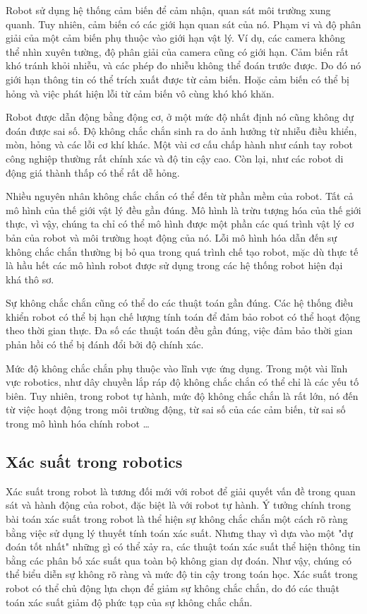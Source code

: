 Robot sử dụng hệ thống cảm biến để cảm nhận, quan sát môi trường xung quanh. Tuy nhiên, cảm biến có các giới hạn quan sát của nó. Phạm vi và độ phân giải của một cảm biến phụ thuộc vào giới hạn vật lý. Ví dụ, các camera không thể nhìn xuyên tường, độ phân giải của camera cũng có giới hạn. Cảm biến rất khó tránh khỏi nhiễu, và các phép đo nhiễu không thể đoán trước được. Do đó nó giới hạn thông tin có thể trích xuất được từ cảm biến. Hoặc cảm biến có thể bị hỏng và việc phát hiện lỗi từ cảm biến vô cùng khó khó khăn. 

Robot được dẫn động bằng động cơ, ở một mức độ nhất định nó cũng không dự đoán được sai số. Độ không chắc chắn sinh ra do ảnh hưởng từ nhiễu điều khiển, mòn, hỏng và các lỗi cơ khí khác. Một vài cơ cấu chấp hành như cánh tay robot công nghiệp thường rất chính xác và độ tin cậy cao. Còn lại, như các robot di động giá thành thấp có thể rất dễ hỏng. 

Nhiều nguyên nhân không chắc chắn có thể đến từ phần mềm của robot. Tất cả mô hình của thế giới vật lý đều gần đúng. Mô hình là trừu tượng hóa của thế giới thực, vì vậy, chúng ta chỉ có thể mô hình được một phần các quá trình vật lý cơ bản của robot và môi trường hoạt động của nó. Lỗi mô hình hóa dẫn đến sự không chắc chắn thường bị bỏ qua trong quá trình chế tạo robot, mặc dù thực tế là hầu hết các mô hình robot được sử dụng trong các hệ thống robot hiện đại khá thô sơ. 

Sự không chắc chắn cũng có thể do các thuật toán gần đúng. Các hệ thống điều khiển robot có thể bị hạn chế lượng tính toán để đảm bảo robot có thể hoạt động theo thời gian thực. Đa số các thuật toán đều gần đúng, việc đảm bảo thời gian phản hồi có thể bị đánh đổi bởi độ chính xác. 

Mức độ không chắc chắn phụ thuộc vào lĩnh vực ứng dụng. Trong một vài lĩnh vực robotics, như dây chuyền lắp ráp độ không chắc chắn có thể chỉ là các yếu tố biên. Tuy nhiên, trong robot tự hành, mức độ không chắc chắn là rất lớn, nó đến từ việc hoạt động trong môi trường động, từ sai số của các cảm biến, từ sai số trong mô hình hóa chính robot \dots 

\subsection{Xác suất trong robotics}

Xác suất trong robot là tương đối mới với robot để giải quyết vấn đề trong quan sát và hành động của robot, đặc biệt là với robot tự hành. Ý tưởng chính trong bài toán xác suất trong robot là thể hiện sự không chắc chắn một cách rõ ràng bằng việc sử dụng lý thuyết tính toán xác suất. Nhưng thay vì dựa vào một "dự đoán tốt nhất" những gì có thể xảy ra, các thuật toán xác suất thể hiện thông tin bằng các phân bố xác suất qua toàn bộ không gian dự đoán. Như vậy, chúng có thể biểu diễn sự không rõ ràng và mức độ tin cậy trong toán học. Xác suất trong robot có thể chủ động lựa chọn để giảm sự không chắc chắn, do đó các thuật toán xác suất giảm độ phức tạp của sự không chắc chắn. 

